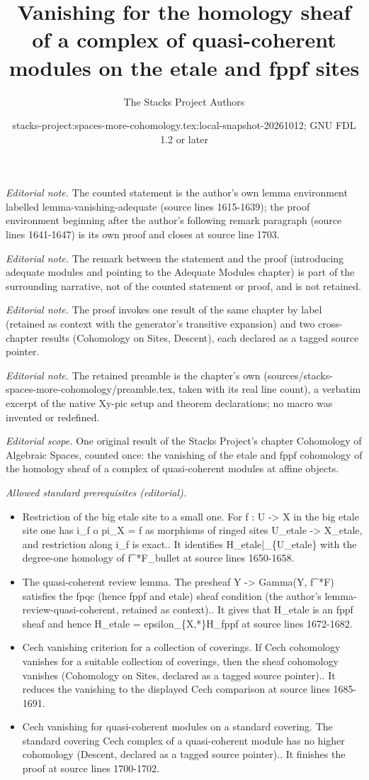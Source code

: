 \documentclass{stacks-project}
\title{Vanishing for the homology sheaf of a complex of quasi-coherent modules on the etale and fppf sites}
\author{The Stacks Project Authors}
\date{stacks-project:spaces-more-cohomology.tex:local-snapshot-20261012; GNU FDL 1.2 or later}
\theoremstyle{plain}
\theoremstyle{definition}
\theoremstyle{remark}
\numberwithin{equation}{subsection}
\begin{document}
\maketitle
\noindent\textit{Editorial note.} The counted statement is the author's own lemma environment labelled lemma-vanishing-adequate (source lines 1615-1639); the proof environment beginning after the author's following remark paragraph (source lines 1641-1647) is its own proof and closes at source line 1703.\par\medskip
\noindent\textit{Editorial note.} The remark between the statement and the proof (introducing adequate modules and pointing to the Adequate Modules chapter) is part of the surrounding narrative, not of the counted statement or proof, and is not retained.\par\medskip
\noindent\textit{Editorial note.} The proof invokes one result of the same chapter by label (retained as context with the generator's transitive expansion) and two cross-chapter results (Cohomology on Sites, Descent), each declared as a tagged source pointer.\par\medskip
\noindent\textit{Editorial note.} The retained preamble is the chapter's own (sources/stacks-spaces-more-cohomology/preamble.tex, taken with its real line count), a verbatim excerpt of the native Xy-pic setup and theorem declarations; no macro was invented or redefined.\par\medskip
\noindent\textit{Editorial scope.} One original result of the Stacks Project's chapter Cohomology of Algebraic Spaces, counted once: the vanishing of the etale and fppf cohomology of the homology sheaf of a complex of quasi-coherent modules at affine objects.\par\medskip
\noindent\textit{Allowed standard prerequisites (editorial).}\begin{itemize}
\item Restriction of the big etale site to a small one. For f : U -> X in the big etale site one has i\_f o pi\_X = f as morphisms of ringed sites U\_etale -> X\_etale, and restriction along i\_f is exact.. It identifies H\_etale|\_\{U\_etale\} with the degree-one homology of f\textasciicircum{}*F\_bullet at source lines 1650-1658.
\item The quasi-coherent review lemma. The presheaf Y -> Gamma(Y, f\textasciicircum{}*F) satisfies the fpqc (hence fppf and etale) sheaf condition (the author's lemma-review-quasi-coherent, retained as context).. It gives that H\_etale is an fppf sheaf and hence H\_etale = epsilon\_\{X,*\}H\_fppf at source lines 1672-1682.
\item Cech vanishing criterion for a collection of coverings. If Cech cohomology vanishes for a suitable collection of coverings, then the sheaf cohomology vanishes (Cohomology on Sites, declared as a tagged source pointer).. It reduces the vanishing to the displayed Cech comparison at source lines 1685-1691.
\item Cech vanishing for quasi-coherent modules on a standard covering. The standard covering Cech complex of a quasi-coherent module has no higher cohomology (Descent, declared as a tagged source pointer).. It finishes the proof at source lines 1700-1702.
\end{itemize}\medskip
\end{document}
